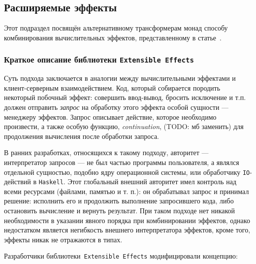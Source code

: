 \subsection{Расширяемые эффекты}

Этот подраздел посвящён альтернативному трансформерам монад способу комбинирования вычислительных эффектов, представленному в статье~\autocite{ExtEffects}. 

\subsubsection{Краткое описание библиотеки \lstinline{Extensible Effects}}

Суть подхода заключается в аналогии между вычислительными эффектами и клиент-серверным взаимодействием. Код, который собирается породить некоторый побочный эффект: совершить ввод-вывод, бросить исключение и т.п. должен отправить \emph{запрос} на обработку этого эффекта особой сущности --- менеджеру эффектов. Запрос описывает действие, которое необходимо произвести, а также особую функцию, \emph{continuation}, (TODO: мб заменить) для продолжения вычисления после обработки запроса. 

В ранних разработках, относящихся к такому подходу, авторитет --- интерпретатор запросов --- не был частью программы пользователя, а являлся отдельной сущностью, подобно ядру операционной системы, или обработчику \lstinline{IO}-действий в \lstinline{Haskell}. Этот глобальный внешний авторитет имел контроль над всеми ресурсами (файлами, памятью и т. п.): он обрабатывал запрос и принимал решение: исполнить его и продолжить выполнение запросившего кода, либо остановить вычисление и вернуть результат. При таком подходе нет никакой необходимости в указании явного порядка при комбинировании эффектов, однако недостатком является негибкость внешнего интерпретатора эффектов, кроме того, эффекты никак не отражаются в типах.

Разработчики библиотеки~\lstinline{Extensible Effects} модифицировали концепцию: 

